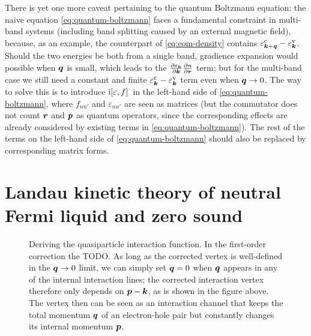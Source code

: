\documentclass[hyperref, a4paper]{article}
\newcommand*{\ii}{\mathrm{i}}
\begin{document}
There is yet one more caveat pertaining to the quantum Boltzmann equation:
the naive equation \eqref{eq:quantum-boltzmann} faces a fundamental constraint in multi-band systems
(including band splitting caused by an external magnetic field),
because, as an example, the counterpart of \eqref{eq:eom-density}
contains $\varepsilon^{\text{c}}_{\vb*{k} + \vb*{q}} - \varepsilon^{\text{v}}_{\vb*{k}}$.
Should the two energies be both from a single band, 
gradience expansion would possible when $\vb*{q}$ is small, 
which leads to the $\pdv{\varepsilon_{\vb*{k}}}{\vb*{k}} \pdv{n}{\vb*{r}}$ term;
but for the multi-band case we still need a constant and finite 
$\varepsilon^{\text{c}}_{\vb*{k}} - \varepsilon^{\text{v}}_{\vb*{k}}$ term
even when $\vb*{q} \to 0$.
The way to solve this is to introduce $\ii \comm*{\varepsilon}{f}$ 
in the left-hand side of \eqref{eq:quantum-boltzmann},
where $f_{n n'}$ and $\varepsilon_{n n'}$
are seen as matrices (but the commutator does not count $\vb*{r}$ and $\vb*{p}$ as 
quantum operators, since the corresponding effects are already considered 
by existing terms in \eqref{eq:quantum-boltzmann}).
The rest of the terms on the left-hand side of \eqref{eq:quantum-boltzmann}
should also be replaced by corresponding matrix forms.

\section{Landau kinetic theory of neutral Fermi liquid and zero sound} 

\begin{figure}
    \centering
    
    \caption{Deriving the quasiparticle interaction function.
    In the first-order correction the TODO.
    As long as the corrected vertex is well-defined in the $\vb*{q} \to 0$ limit, 
    we can simply set $\vb*{q} = 0$ when $\vb*{q}$ appears 
    in any of the internal interaction lines;
    the corrected interaction vertex therefore only depends on $\vb*{p} - \vb*{k}$,
    as is shown in the figure above.
    The vertex then can be seen as an interaction channel 
    that keeps the total momentum $\vb*{q}$ of an electron-hole pair 
    but constantly changes its internal momentum $\vb*{p}$.}
\end{figure}
\end{document}
